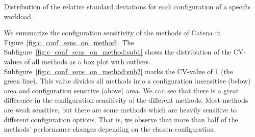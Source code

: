 Distribution of the relative standard deviations for each configuration of a specific workload.

We summarize the configuration sensitivity of the methods of Catena in Figure~\ref{fig:c_conf_sens_on_method}. The Subfigure~\ref{fig:c_conf_sens_on_method:sub1} shows the distribution of the \ac{CV}-values of all methods as a box plot with outliers. Subfigure~\ref{fig:c_conf_sens_on_method:sub2} marks the \ac{CV}-value of 1 (the green line). This value divides all methods into a configuration insensitive (below) area and configuration sensitive (above) area. We can see that there is a great difference in the configuration sensitivity of the different methods. Most methods are weak sensitive, but there are some methods which are heavily sensitive to different configuration options. That is, we observe that more than half of the methods' performance changes depending on the chosen configuration. 

